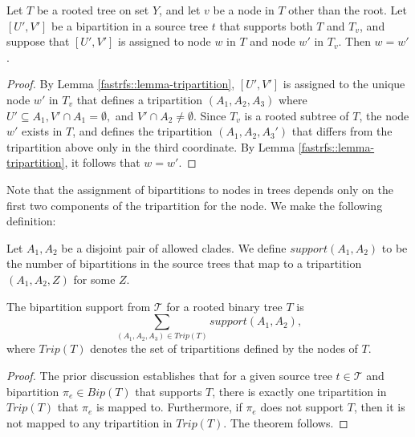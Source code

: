 \begin{lemma}
Let $T$ be a rooted tree on set $Y$, and let $v$ be a node
in $T$ other than the root.  
Let $[U',V']$ be a bipartition in 
a source tree $t$ that supports both $T$ and $T_v$,
and suppose that $[U',V']$ is assigned to node $w$ in $T$
and node $w'$ in $T_v$. Then $w=w'$.
\label{fastrfs::lemma-unique}
\end{lemma}
\begin{proof}
By Lemma \ref{fastrfs::lemma-tripartition},
$[U',V']$ is assigned
to the unique node $w'$ in $T_v$ that defines a  tripartition
$(A_1, A_2, A_3)$ where
$U' \subseteq A_1, V' \cap A_1 = \emptyset, $ and
$V' \cap A_2 \neq \emptyset$.
Since $T_v$ is a rooted subtree of $T$, the node $w'$ exists
in $T$, and defines the tripartition $(A_1, A_2, A_3')$ that
differs from the tripartition above
only in the third coordinate.
By Lemma \ref{fastrfs::lemma-tripartition}, it
follows that $w=w'$.
\end{proof}
Note that the assignment of bipartitions to nodes in
trees depends only on the first two
components of the tripartition for the node. We
make the following definition:
\begin{definition}
Let $A_1, A_2$ be a disjoint pair of
allowed clades.
We define $support(A_1,A_2)$ to be
the  number of bipartitions in the
source trees that map to a
tripartition $(A_1,A_2,Z)$ for
some $Z$.
\end{definition}
\begin{theorem}
The bipartition
support from $\mathcal{T}$ for a rooted binary tree $T$ is
 $$\sum_{(A_1,A_2,A_3) \in Trip(T)} support(A_1,A_2),$$ where
$Trip(T)$ denotes the set of tripartitions
defined by the nodes of  $T$.
\end{theorem}
\begin{proof}
The prior discussion establishes that for a given
source tree $t \in \mathcal{T}$ and bipartition $\pi_e \in Bip(T)$
that supports $T$, 
there is exactly one tripartition in $Trip(T)$ that
$\pi_e$ is mapped to. Furthermore, if $\pi_e$ does not
support $T$, then it is not mapped to any tripartition in $Trip(T)$.
The theorem follows.
\end{proof}







